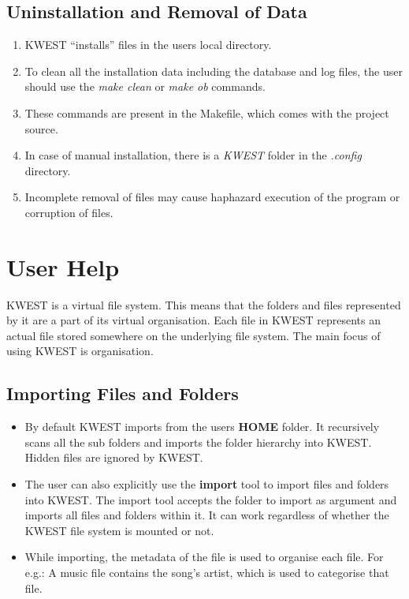 \subsection{Uninstallation and Removal of Data}
\begin{enumerate}
\item KWEST ``installs'' files in the users local directory.
\item To clean all the installation data including the database and log files, the user should use the \emph{make clean} or \emph{make ob} commands.
\item These commands are present in the Makefile, which comes with the project source.
\item In case of manual installation, there is a \emph{KWEST} folder in the \emph{.config} directory.
\item Incomplete removal of files may cause haphazard execution of the program or corruption of files.
\end{enumerate}

\newpage
\section{User Help}

KWEST is a virtual file system. This means that the folders and files represented by it are a part of its virtual organisation. Each file in KWEST represents an actual file stored somewhere on the underlying file system. The main focus of using KWEST is organisation.

\subsection{Importing Files and Folders}

\begin{itemize}
\item By default KWEST imports from the users \textbf{HOME} folder. It recursively scans all the sub folders and imports the folder hierarchy into KWEST. Hidden files are ignored by KWEST.

\item The user can also explicitly use the \textbf{import} tool to import files and folders into KWEST. The import tool accepts the folder to import as argument and imports all files and folders within it. It can work regardless of whether the KWEST file system is mounted or not.

\item While importing, the metadata of the file is used to organise each file. For e.g.: A music file contains the song's artist, which is used to categorise that file.
\end{itemize}

